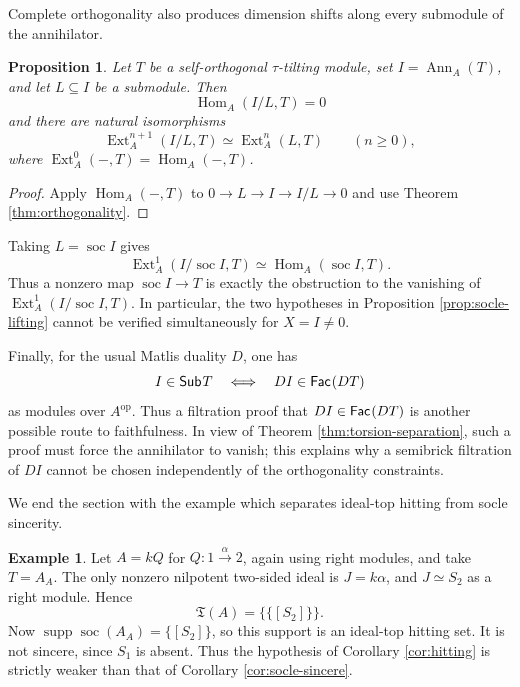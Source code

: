 \documentclass[a4paper,reqno]{amsart}
\newtheorem{proposition}[theorem]{Proposition}
\theoremstyle{definition}
\newtheorem{example}[theorem]{Example}
\newcommand{\Ext}{\operatorname{Ext}\nolimits}
\newcommand{\Hom}{\operatorname{Hom}\nolimits}
\newcommand{\Ann}{\operatorname{Ann}\nolimits}
\newcommand{\soc}{\operatorname{soc}\nolimits}
\newcommand{\supp}{\operatorname{supp}\nolimits}
\newcommand{\Fac}{\mathsf{Fac}\hspace{.01in}}
\newcommand{\Sub}{\mathsf{Sub}\hspace{.01in}}
\numberwithin{equation}{section}
\begin{document}
Complete orthogonality also produces dimension shifts along every
submodule of the annihilator.

\begin{proposition}
\label{prop:ann-shift}
Let $T$ be a self-orthogonal $\tau$-tilting module, set
$I=\Ann_A(T)$, and let $L\subseteq I$ be a submodule. Then
\[
                 \Hom_A(I/L,T)=0
\]
and there are natural isomorphisms
\[
 \Ext_A^{n+1}(I/L,T)\simeq\Ext_A^n(L,T)
 \qquad(n\geq0),
\]
where $\Ext_A^0(-,T)=\Hom_A(-,T)$.
\end{proposition}

\begin{proof}
Apply $\Hom_A(-,T)$ to
$0\to L\to I\to I/L\to0$ and use Theorem
\ref{thm:orthogonality}.
\end{proof}

Taking $L=\soc I$ gives
\begin{equation}\label{eq:socle-shift}
        \Ext_A^1(I/\soc I,T)\simeq\Hom_A(\soc I,T).
\end{equation}
Thus a nonzero map $\soc I\to T$ is exactly the obstruction to the
vanishing of $\Ext_A^1(I/\soc I,T)$. In particular, the two
hypotheses in Proposition \ref{prop:socle-lifting} cannot be verified
simultaneously for $X=I\neq0$.

Finally, for the usual Matlis duality $D$, one has
\begin{equation}\label{eq:dual-cogen}
                 I\in\Sub T
       \quad\Longleftrightarrow\quad
                 DI\in\Fac(DT)
\end{equation}
as modules over $A^{\mathrm{op}}$. Thus a filtration proof that
$DI\in\Fac(DT)$ is another possible route to faithfulness. In view
of Theorem \ref{thm:torsion-separation}, such a proof must force the
annihilator to vanish; this explains why a semibrick filtration of
$DI$ cannot be chosen independently of the orthogonality constraints.

 We end the section with the example which separates ideal-top hitting from socle sincerity.

 \begin{example}
\label{ex:hitting-not-sincere}
Let $A=kQ$ for $Q:1\xrightarrow{\alpha}2$, again using right
modules, and take $T=A_A$. The only nonzero nilpotent two-sided ideal
is $J=k\alpha$, and $J\simeq S_2$ as a right module. Hence
\[
                    \mathfrak T(A)=\bigl\{\{[S_2]\}\bigr\}.
\]
Now $\supp\soc(A_A)=\{[S_2]\}$, so this support is an ideal-top
hitting set. It is not sincere, since $S_1$ is absent. Thus the
hypothesis of Corollary \ref{cor:hitting} is strictly weaker than that
of Corollary \ref{cor:socle-sincere}.
\end{example}
\end{document}
